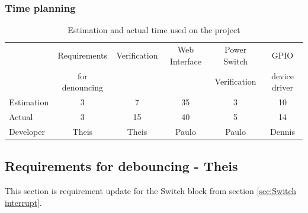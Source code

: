 \subsubsection{Time planning}

\begin{table}[H]
\centering
	\begin{tabular}{|l|c|c|c|c|c|}
		\hline
		~			& Requirements	& Verification	& Web Interface  	& Power Switch 	& GPIO \\
		~			& for denouncing	& ~ 			& ~				& Verification		& device driver \\\hline
		Estimation	& 3				& 7			& 35		     		&	3			& 10			\\
		Actual		& 3 				& 15			& 40		     		&	5			& 14			\\
		Developer	& Theis			& Theis		& Paulo			&	Paulo		& Dennis		\\
		\hline
	\end{tabular}
	\caption{Estimation and actual time used on the project}
\end{table}
\subsection{Requirements for debouncing - Theis}
%
This section is requirement update for the Switch block from section \ref{sec:Switch interrupt}.
